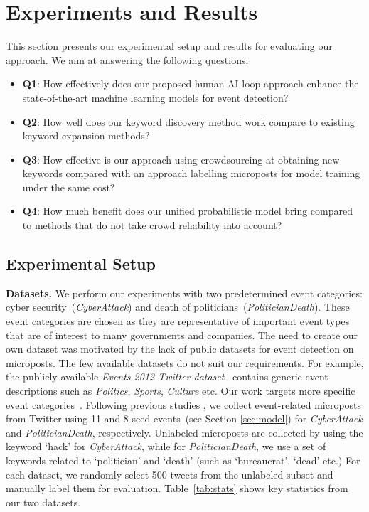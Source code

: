 \documentclass[letterpaper]{article}
\begin{document}
\section{Experiments and Results}
\label{sec:results}
This section presents our experimental setup and results for evaluating our approach. We aim at answering the following questions:

\begin{itemize}[noitemsep,leftmargin=*]
    \item \textbf{Q1}: How effectively does our proposed human-AI loop approach enhance the state-of-the-art machine learning models for event detection?
    \item \textbf{Q2}: How well does our keyword discovery method work compare to existing keyword expansion methods?
    \item \textbf{Q3}: How effective is our approach using crowdsourcing at obtaining new keywords compared with an approach labelling microposts for model training under the same cost?
    \item \textbf{Q4}: How much benefit does our unified probabilistic model bring compared to methods that do not take crowd reliability into account?
\end{itemize}


\subsection{Experimental Setup}

\textbf{Datasets.} We perform our experiments with two predetermined event categories: cyber security~(\emph{CyberAttack}) and death of politicians~(\emph{PoliticianDeath}). These event categories are chosen as they are representative of important event types that are of interest to many governments and companies. The need to create our own dataset was motivated by the lack of public datasets for event detection on microposts. The few available datasets do not suit our requirements. For example, the publicly available \textit{Events-2012 Twitter dataset}~\cite{mcminn2013building} contains generic event descriptions such as \textit{Politics}, \textit{Sports}, \textit{Culture} etc. Our work targets more specific event categories~\cite{bhardwaj2019TKDE}.
Following previous studies \cite{ritter2015weakly}, we collect event-related microposts from Twitter using 11 and 8 seed events~(see Section \ref{sec:model}) for \emph{CyberAttack} and \emph{PoliticianDeath}, respectively. Unlabeled microposts are collected by using the keyword \lq hack' for \emph{CyberAttack}, while for \emph{PoliticianDeath}, we use a set of keywords related to \lq politician' and \lq death' (such as \lq bureaucrat', \lq dead' etc.) %
For each dataset, we randomly select 500 tweets from the unlabeled subset and manually label them for evaluation. Table~\ref{tab:stats} shows key statistics from our two datasets.
\end{document}
